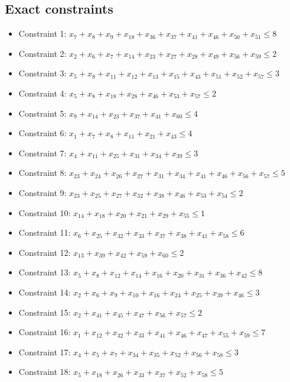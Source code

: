 \documentclass[11pt]{article}
\begin{document}
\subsection*{Exact constraints}
\begin{itemize}
\item Constraint 1: $x_{7} + x_{8} + x_{9} + x_{18} + x_{36} + x_{37} + x_{41} + x_{46} + x_{50} + x_{51} \le 8$
\item Constraint 2: $x_{2} + x_{6} + x_{7} + x_{14} + x_{23} + x_{27} + x_{28} + x_{49} + x_{56} + x_{59} \le 2$
\item Constraint 3: $x_{5} + x_{8} + x_{11} + x_{12} + x_{13} + x_{15} + x_{43} + x_{51} + x_{52} + x_{57} \le 3$
\item Constraint 4: $x_{5} + x_{8} + x_{18} + x_{28} + x_{46} + x_{53} + x_{57} \le 2$
\item Constraint 5: $x_{9} + x_{14} + x_{23} + x_{37} + x_{41} + x_{60} \le 4$
\item Constraint 6: $x_{1} + x_{7} + x_{8} + x_{11} + x_{21} + x_{43} \le 4$
\item Constraint 7: $x_{4} + x_{11} + x_{25} + x_{31} + x_{34} + x_{39} \le 3$
\item Constraint 8: $x_{23} + x_{24} + x_{26} + x_{27} + x_{31} + x_{34} + x_{41} + x_{46} + x_{56} + x_{57} \le 5$
\item Constraint 9: $x_{23} + x_{25} + x_{27} + x_{32} + x_{38} + x_{46} + x_{53} + x_{54} \le 2$
\item Constraint 10: $x_{14} + x_{18} + x_{20} + x_{21} + x_{29} + x_{55} \le 1$
\item Constraint 11: $x_{6} + x_{25} + x_{32} + x_{33} + x_{37} + x_{38} + x_{41} + x_{58} \le 6$
\item Constraint 12: $x_{13} + x_{39} + x_{42} + x_{59} + x_{60} \le 2$
\item Constraint 13: $x_{5} + x_{8} + x_{12} + x_{14} + x_{16} + x_{20} + x_{31} + x_{36} + x_{42} \le 8$
\item Constraint 14: $x_{2} + x_{6} + x_{9} + x_{10} + x_{16} + x_{24} + x_{25} + x_{39} + x_{46} \le 3$
\item Constraint 15: $x_{2} + x_{41} + x_{45} + x_{47} + x_{56} + x_{57} \le 2$
\item Constraint 16: $x_{1} + x_{12} + x_{32} + x_{33} + x_{41} + x_{46} + x_{47} + x_{55} + x_{59} \le 7$
\item Constraint 17: $x_{4} + x_{5} + x_{7} + x_{34} + x_{35} + x_{52} + x_{56} + x_{58} \le 3$
\item Constraint 18: $x_{5} + x_{18} + x_{26} + x_{33} + x_{37} + x_{52} + x_{58} \le 5$

\end{itemize}
\end{document}
